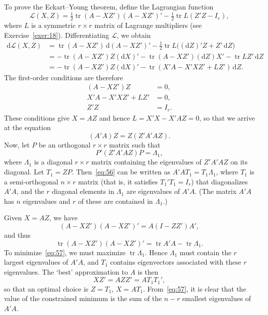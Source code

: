 \documentclass[12pt,a4paper]{article}
\theoremstyle{definition}
\DeclareMathOperator{\tr}{tr}
\newcommand{\dd}{\mathrm{d}}
\begin{document}
To prove the Eckart--Young theorem, define the Lagrangian function
\begin{equation}\label{eq:54}
\mathcal{L}(X, Z) = \tfrac{1}{2}\tr(A - XZ')(A - XZ')' - \tfrac{1}{2}\tr L(Z'Z - I_r),
\end{equation}
where $L$ is a symmetric $r \times r$ matrix of Lagrange multipliers (see Exercise~\ref{exer:18}). Differentiating $\mathcal{L}$, we obtain
\begin{align*}
\dd\mathcal{L}(X, Z) &= \tr(A - XZ')\, \dd(A - XZ')' - \tfrac{1}{2}\tr L\bigl((\dd Z)'Z + Z'\, \dd Z\bigr) \\
&= -\tr(A - XZ')Z(\dd X)' - \tr(A - XZ')(\dd Z)X' - \tr LZ'\, \dd Z \\
&= -\tr(A - XZ')Z(\dd X)' - \tr(X'A - X'XZ' + LZ')\, \dd Z.
\end{align*}
The first-order conditions are therefore
\begin{equation}\label{eq:55}
\begin{aligned}
(A - XZ')Z &= 0, \\
X'A - X'XZ' + LZ' &= 0, \\
Z'Z &= I_r.
\end{aligned}
\end{equation}
These conditions give $X = AZ$ and hence $L = X'X - X'AZ = 0$, so that we arrive at the equation
\begin{equation}\label{eq:56}
(A'A)Z = Z(Z'A'AZ).
\end{equation}
Now, let $P$ be an orthogonal $r \times r$ matrix such that
\[
P'(Z'A'AZ)P = \Lambda_1,
\]
where $\Lambda_1$ is a diagonal $r \times r$ matrix containing the eigenvalues of $Z'A'AZ$ on its diagonal. Let $T_1 = ZP$. Then~\eqref{eq:56} can be written as $A'AT_1 = T_1\Lambda_1$, where $T_1$ is a semi-orthogonal $n \times r$ matrix (that is, it satisfies $T_1'T_1 = I_r$) that diagonalizes $A'A$, and the $r$ diagonal elements in $\Lambda_1$ are eigenvalues of $A'A$. (The matrix $A'A$ has $n$ eigenvalues and $r$ of these are contained in $\Lambda_1$.) %

Given $X = AZ$, we have
\[
(A - XZ')(A - XZ')' = A(I - ZZ')A',
\]
and thus
\begin{equation}\label{eq:57}
\tr(A - XZ')(A - XZ')' = \tr A'A - \tr\Lambda_1.
\end{equation}
To minimize~\eqref{eq:57}, we must maximize $\tr\Lambda_1$. Hence $\Lambda_1$ must contain the $r$ largest eigenvalues of $A'A$, and $T_1$ contains eigenvectors associated with these $r$ eigenvalues. The `best' approximation to $A$ is then
\[
XZ' = AZZ' = AT_1 T_1',
\]
so that an optimal choice is $Z = T_1$, $X = AT_1$. From~\eqref{eq:57}, it is clear that the value of the constrained minimum is the sum of the $n - r$ smallest eigenvalues of $A'A$. %
\end{document}
